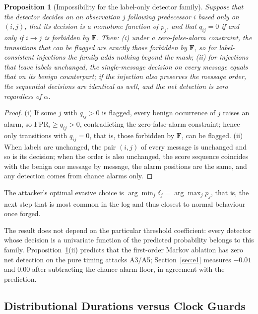 \documentclass[manuscript,screen,review]{acmart}
\newtheorem{proposition}[theorem]{Proposition}%
\begin{document}
\begin{proposition}[Impossibility for the label-only detector family]
\label{prop:ta}
Suppose that the detector decides on an observation $j$ following predecessor $i$ based only on $(i,j)$, that its decision is a monotone function of $p_j$, and that $q_{ij}=0$ if and only if $i\to j$ is forbidden by $\mathbf F$. Then:
(i) under a zero-false-alarm constraint, the transitions that can be flagged are exactly those forbidden by $\mathbf F$, so for label-consistent injections the family adds nothing beyond the mask;
(ii) for injections that leave labels unchanged, the single-message decision on every message equals that on its benign counterpart; if the injection also preserves the message order, the sequential decisions are identical as well, and the net detection is zero regardless of $\alpha$.
\end{proposition}

\begin{proof}
(i) If some $j$ with $q_{ij}>0$ is flagged, every benign occurrence of $j$ raises an alarm, so $\mathrm{FPR}_i\ge q_{ij}>0$, contradicting the zero-false-alarm constraint; hence only transitions with $q_{ij}=0$, that is, those forbidden by $\mathbf F$, can be flagged. (ii) When labels are unchanged, the pair $(i,j)$ of every message is unchanged and so is its decision; when the order is also unchanged, the score sequence coincides with the benign one message by message, the alarm positions are the same, and any detection comes from chance alarms only.
\end{proof}

The attacker's optimal evasive choice is $\arg\min_j\delta_j=\arg\max_j p_j$, that is, the next step that is most common in the log and thus closest to normal behaviour once forged.

The result does not depend on the particular threshold coefficient: every detector whose decision is a univariate function of the predicted probability belongs to this family. Proposition~\ref{prop:ta}(ii) predicts that the first-order Markov ablation has zero net detection on the pure timing attacks {A3}/{A5}; Section~\ref{sec:e1} measures $-0.01$ and $0.00$ after subtracting the chance-alarm floor, in agreement with the prediction.

\subsection{Distributional Durations versus Clock Guards}
\label{sec:md}
\end{document}

